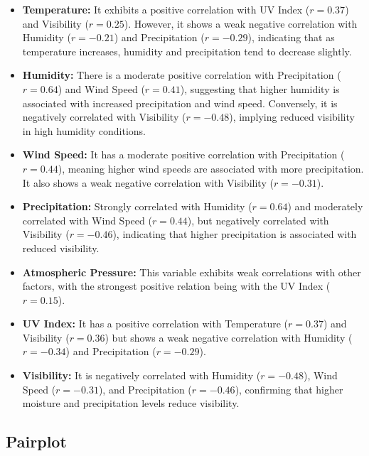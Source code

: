 \documentclass{article}
\begin{document}
\begin{itemize}
\item \textbf{Temperature:} It exhibits a positive correlation with UV Index ($r = 0.37$) and Visibility ($r = 0.25$). However, it shows a weak negative correlation with Humidity ($r = -0.21$) and Precipitation ($r = -0.29$), indicating that as temperature increases, humidity and precipitation tend to decrease slightly.
\item \textbf{Humidity:} There is a moderate positive correlation with Precipitation ($r = 0.64$) and Wind Speed ($r = 0.41$), suggesting that higher humidity is associated with increased precipitation and wind speed. Conversely, it is negatively correlated with Visibility ($r = -0.48$), implying reduced visibility in high humidity conditions.

\item \textbf{Wind Speed:} It has a moderate positive correlation with Precipitation ($r = 0.44$), meaning higher wind speeds are associated with more precipitation. It also shows a weak negative correlation with Visibility ($r = -0.31$).

\item \textbf{Precipitation:} Strongly correlated with Humidity ($r = 0.64$) and moderately correlated with Wind Speed ($r = 0.44$), but negatively correlated with Visibility ($r = -0.46$), indicating that higher precipitation is associated with reduced visibility.

\item \textbf{Atmospheric Pressure:} This variable exhibits weak correlations with other factors, with the strongest positive relation being with the UV Index ($r = 0.15$).

\item \textbf{UV Index:} It has a positive correlation with Temperature ($r = 0.37$) and Visibility ($r = 0.36$) but shows a weak negative correlation with Humidity ($r = -0.34$) and Precipitation ($r = -0.29$).

\item \textbf{Visibility:} It is negatively correlated with Humidity ($r = -0.48$), Wind Speed ($r = -0.31$), and Precipitation ($r = -0.46$), confirming that higher moisture and precipitation levels reduce visibility.
\end{itemize}



\subsection{Pairplot}
\end{document}
